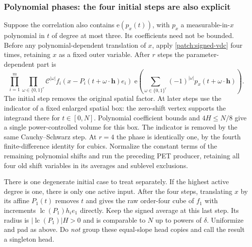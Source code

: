 \documentclass[11pt]{article}
\theoremstyle{definition}
\newcommand{\ee}[1]{\mathrm e\!\left(#1\right)}
\begin{document}
\subsubsection{Polynomial phases: the four initial steps are also explicit}
Suppose the correlation also contains $\ee{p_x(t)}$, with $p_x$ a measurable-in-$x$ polynomial
in $t$ of degree at most three.  Its coefficients need not be bounded.
Before any polynomial-dependent translation of $x$, apply \cref{patch:signed-vdc} four times,
retaining $x$ as a fixed outer variable.  After $r$ steps the parameter-dependent part is
\[
 \prod_{i=1}^{m}\prod_{\omega\in\{0,1\}^r}\mathcal C^{|\omega|}
     f_i(x-P_i(t+\omega\cdot\mathbf h)e_i)\;
 \ee{\sum_{\omega\in\{0,1\}^r}(-1)^{|\omega|}p_x(t+\omega\cdot\mathbf h)}.
\]
The initial step removes the original spatial factor.  At later steps use the indicator of
a fixed enlarged spatial box: the zero-shift vertex supports the integrand there for
$t\in[0,N]$.  Polynomial coefficient bounds and $4H\leq N/8$ give a single power-controlled
volume for this box.  The indicator is removed by the same Cauchy--Schwarz step.
At $r=4$ the phase is identically one, by the fourth finite-difference identity for cubics.
Normalize the constant terms of the remaining polynomial shifts and run the preceding PET
producer, retaining all four old shift variables in its averages and sublevel exclusions.

There is one degenerate initial case to treat separately.  If the highest active degree is
one, there is only one active input.  After the four steps, translating $x$ by its affine
$P_1(t)$ removes $t$ and gives the raw order-four cube of $f_1$ with increments
$\operatorname{lc}(P_1)h_i e_1$ directly.  Keep the signed average at this last step.
Its radius is $|\operatorname{lc}(P_1)|H>0$ and is comparable to $N$ up to powers of $\delta$.
Uniformize and pad as above.  Do \emph{not} group these equal-slope head copies and call the
result a singleton head.
\end{document}
